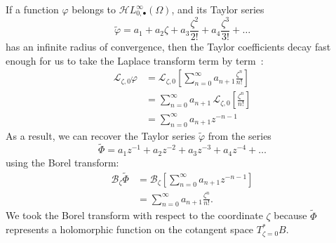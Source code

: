 \documentclass{article}
\newcommand{\singexp}[2]{\mathcal{H}L^\infty_{#1, #2}}
\newcommand{\singexpalg}[1]{\singexp{#1}{\bullet}}
\newcommand{\maps}{\colon}
\newcommand{\C}{\mathbb{C}}
\newcommand{\series}[1]{\tilde{#1}}
\newcommand{\laplace}{\mathcal{L}}
\newcommand{\borel}{\mathcal{B}}
\theoremstyle{definition}
\theoremstyle{plain}
\begin{document}
If a function $\varphi$ belongs to $\singexpalg{0}(\Omega)$, and its Taylor series
\[ \series{\varphi} = a_1 + a_2 \zeta + a_3 \frac{\zeta^2}{2!} + a_4 \frac{\zeta^3}{3!} + \ldots \]
has an infinite radius of convergence, then the Taylor coefficients decay fast enough for us to take the Laplace transform term by term~\cite[Theorem 5.20]{diverg-resurg-i}:
\begin{align*}
  \laplace_{\zeta, 0}\varphi&=\laplace_{\zeta,0}\left[\sum_{n=0}^\infty a_{n+1}\frac{\zeta^n}{n!}\right]\\
  &=\sum_{n=0}^\infty a_{n+1}\,\laplace_{\zeta,0}\left[\frac{\zeta^n}{n!}\right]\\
  &=\sum_{n=0}^\infty a_{n+1}z^{-n-1}
\end{align*}
As a result, we can recover the Taylor series $\series{\varphi}$ from the series
\[ \series{\Phi} = a_1 z^{-1} + a_2 z^{-2} + a_3 z^{-3} + a_4 z^{-4} + \ldots \]
using the Borel transform:
\begin{align*}
\borel_\zeta \series{\Phi}&=\borel_\zeta\left[\sum_{n=0}^\infty a_{n+1}z^{-n-1}\right]\\
&=\sum_{n=0}^\infty a_{n+1}\frac{\zeta^n}{n!}.
\end{align*}
We took the Borel transform with respect to the coordinate $\zeta$ because $\series{\Phi}$ represents a holomorphic function on the cotangent space $T^*_{\zeta = 0}B$.
\end{document}

